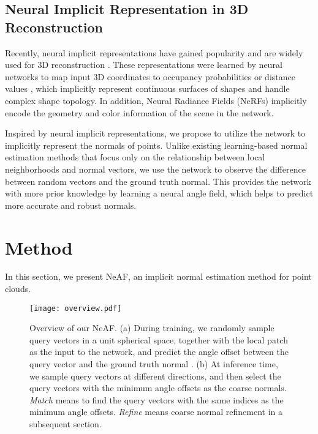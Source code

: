 \documentclass[letterpaper]{article} \usepackage{aaai23}  \usepackage{times}  \usepackage{helvet}  \usepackage{courier}  \usepackage[hyphens]{url}  \usepackage{graphicx} \urlstyle{rm} \def\UrlFont{\rm}  \usepackage{natbib}  \usepackage{caption} \frenchspacing  \setlength{\pdfpagewidth}{8.5in} \setlength{\pdfpageheight}{11in} \usepackage{algorithm}
\begin{document}
\subsection{Neural Implicit Representation in 3D Reconstruction}
Recently, neural implicit representations have gained popularity and are widely used for 3D reconstruction \cite{Zhou2022CAP-UDF, On-SurfacePriors, LPI, PredictableContextPrior, Li2022DCCDIF}. These representations were learned by neural networks to map input 3D coordinates to occupancy probabilities \cite{chen2019learning, mescheder2019occupancy} or distance values \cite{MateuszMichalkiewicz2019ImplicitSR,JeongJoonPark2019DeepSDFLC}, which implicitly represent continuous surfaces of shapes and handle complex shape topology. In addition, Neural Radiance Fields (NeRFs) \cite{mildenhall2020nerf} implicitly encode the geometry and color information of the scene in the network.

Inspired by neural implicit representations, we propose to utilize the network to implicitly represent the normals of points. Unlike existing learning-based normal estimation methods that focus only on the relationship between local neighborhoods and normal vectors, we use the network to observe the difference between random vectors and the ground truth normal. This provides the network with more prior knowledge by learning a neural angle field, which helps to predict more accurate and robust normals.

\section{Method}
In this section, we present NeAF, an implicit normal estimation method for point clouds.

\begin{figure}[t]
\centering
\texttt{[image: overview.pdf]}
\caption{Overview of our NeAF. (a) During training, we randomly sample query vectors in a unit spherical space, together with the local patch as the input to the network, and predict the angle offset  between the query vector  and the ground truth normal . (b) At inference time, we sample  query vectors at different directions, and then select the query vectors with the minimum  angle offsets as the coarse normals. \emph{Match} means to find the query vectors with the same indices as the minimum  angle offsets. \emph{Refine} means coarse normal refinement in a subsequent section.}
\label{fig:overview}
\end{figure}
\end{document}

